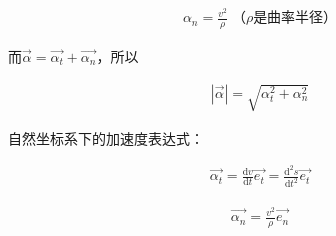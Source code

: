 \documentclass[12pt, a4paper]{article}
\numberwithin{equation}{section}
\newcommand{\rmd}{\mathrm{d}}
\newcommand{\deriv}[2]{\frac{\rmd #1}{\rmd #2}}
\begin{document}
    \begin{align}
        \alpha_n = \frac{v^2}{\rho}\; \text{（\(\rho\)是曲率半径）}
    \end{align}

    而\(\overrightarrow{\alpha} = \overrightarrow{\alpha_t} + \overrightarrow{\alpha_n}\)，所以

    \begin{align}
        \left|\overrightarrow{\alpha}\right| = \sqrt{\alpha_t^2 + \alpha_n^2}
    \end{align}

    自然坐标系下的加速度表达式：
    
    \begin{align}
        \overrightarrow{\alpha_t} = \deriv{v}{t} \overrightarrow{e_t} =
        \frac{\rmd^2 s}{\rmd t^2} \overrightarrow{e_t}
    \end{align}

    \begin{align}
        \overrightarrow{\alpha_n} = \frac{v^2}{\rho} \overrightarrow{e_n}
    \end{align}
\end{document}
